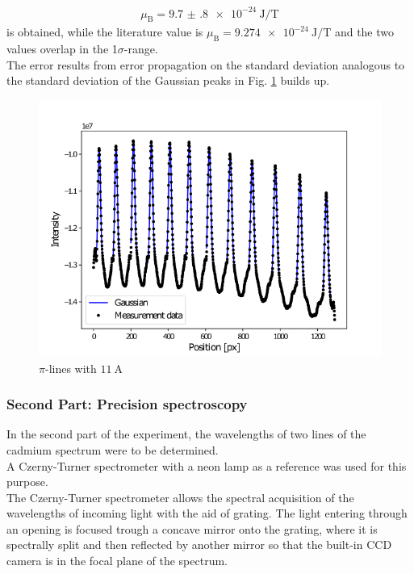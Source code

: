 \begin{align*}
\mu_\text{B}=\SI{9.7(8)e-24}{\joule\per\tesla}
\end{align*}
is obtained, while the literature value is $\mu_\text{B}=\SI{9.274e-24}{\joule\per\tesla}$ and the two values overlap in the 1$\sigma$-range.\\
The error results from error propagation on the standard deviation analogous to the standard deviation of the Gaussian peaks in Fig. \ref{fig:gaussian} builds up.
\begin{figure}[ht]
\centering
\includegraphics[scale=.55]{images//gaussian.png}
\caption{$\pi$-lines with $\SI{11}{\ampere}$}
\label{fig:gaussian}
\end{figure}

\subsubsection{Second Part: Precision spectroscopy}
In the second part of the experiment, the wavelengths of two lines of the cadmium spectrum were to be determined.\\

A Czerny-Turner spectrometer with a neon lamp as a reference was used for this purpose.\\
The Czerny-Turner spectrometer allows the spectral acquisition of the wavelengths of incoming light with the aid of grating.
The light entering through an opening is focused trough a concave mirror onto the grating, where it is spectrally split and then reflected by another mirror so that the built-in CCD camera is in the focal plane of the spectrum.\\

